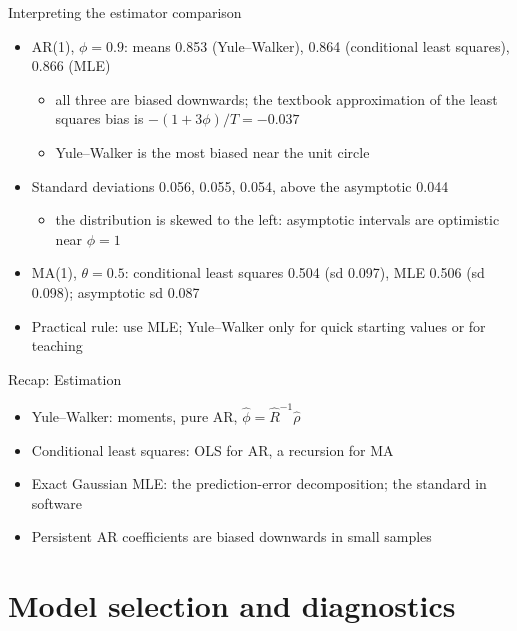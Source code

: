 \begin{frame}{Interpreting the estimator comparison}
\itemsize{\small}
\begin{itemize}
    \item AR(1), $\phi = 0.9$: means 0.853 (Yule--Walker), 0.864 (conditional least squares), 0.866 (MLE)
    \begin{itemize}
        \item all three are biased downwards; the textbook approximation of the least squares bias is $-(1 + 3\phi)/T = \ensuremath{-}0.037$
        \item Yule--Walker is the most biased near the unit circle
    \end{itemize}
    \item Standard deviations 0.056, 0.055, 0.054, above the asymptotic 0.044
    \begin{itemize}
        \item the distribution is skewed to the left: asymptotic intervals are optimistic near $\phi = 1$
    \end{itemize}
    \item MA(1), $\theta = 0.5$: conditional least squares 0.504 (sd 0.097), MLE 0.506 (sd 0.098); asymptotic sd 0.087
    \item Practical rule: use MLE; Yule--Walker only for quick starting values or for teaching
\end{itemize}
\end{frame}

\begin{frame}{Recap: Estimation}
\itemsize{\small}
\begin{itemize}
    \item Yule--Walker: moments, pure AR, $\hat\phi = \hat R^{-1}\hat\rho$
    \item Conditional least squares: OLS for AR, a recursion for MA
    \item Exact Gaussian MLE: the prediction-error decomposition; the standard in software
    \item Persistent AR coefficients are biased downwards in small samples
\end{itemize}
\end{frame}


\section{Model selection and diagnostics}

